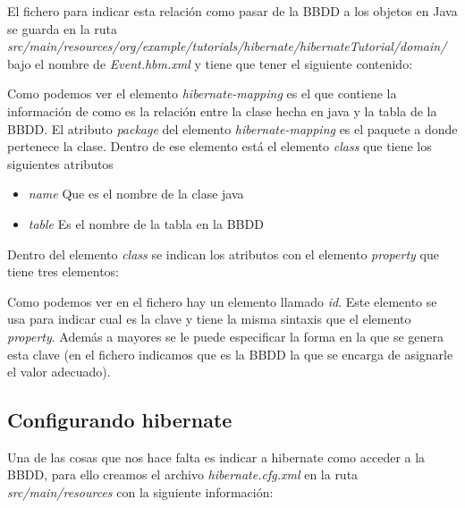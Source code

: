 \documentclass{article}
\begin{document}
	El fichero para indicar esta relación como pasar de la BBDD a los objetos en Java se guarda en la ruta \emph{src/main/resources/org/example/tutorials/hibernate/hibernateTutorial/domain/} bajo el nombre de \emph{Event.hbm.xml} y tiene que tener el siguiente contenido:


	Como podemos ver el elemento \emph{hibernate-mapping} es el que contiene la información de como es la relación entre la clase hecha en java y la tabla de la BBDD. El atributo \emph{package} del elemento \emph{hibernate-mapping} es el paquete a donde pertenece la clase. Dentro de ese elemento está el elemento \emph{class} que tiene los siguientes atributos
{\setlength{\parskip}{0mm}
\begin{itemize}
	\item \emph{name} Que es el nombre de la clase java
	\item \emph{table} Es el nombre de la tabla en la BBDD
\end{itemize}
}
	
	Dentro del elemento \emph{class} se indican los atributos con el elemento \emph{property} que tiene tres elementos:
{\setlength{\parskip}{0mm}
}

	Como podemos ver en el fichero hay un elemento llamado \emph{id}. Este elemento se usa para indicar cual es la clave y tiene la misma sintaxis que el elemento \emph{property}. Además a mayores se le puede especificar la forma en la que se genera esta clave (en el fichero indicamos que es la BBDD la que se encarga de asignarle el valor adecuado).
	
\subsection{Configurando hibernate}
	Una de las cosas que nos hace falta es indicar a hibernate como acceder a la BBDD, para ello creamos el archivo \emph{hibernate.cfg.xml} en la ruta \emph{src/main/resources} con la siguiente información:

\end{document}
